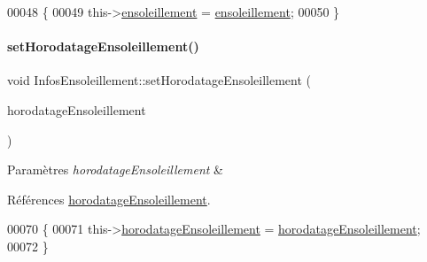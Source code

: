 \begin{DoxyCode}
00048 \{
00049     this->\hyperlink{class_infos_ensoleillement_a5f3ad64743e3beeb4e64c4555ec6155c}{ensoleillement} = \hyperlink{class_infos_ensoleillement_a5f3ad64743e3beeb4e64c4555ec6155c}{ensoleillement};
00050 \}
\end{DoxyCode}
\mbox{\label{class_infos_ensoleillement_a35cd0359b8bcf5bd572cbef2195fa8d1}} 
\paragraph{\texorpdfstring{set\+Horodatage\+Ensoleillement()}{setHorodatageEnsoleillement()}}
{\footnotesize\ttfamily void Infos\+Ensoleillement\+::set\+Horodatage\+Ensoleillement (\begin{DoxyParamCaption}\item[{const Q\+String}]{horodatage\+Ensoleillement }\end{DoxyParamCaption})}


\begin{DoxyParams}{Paramètres}
{\em horodatage\+Ensoleillement} & \\
\hline
\end{DoxyParams}


Références \hyperlink{class_infos_ensoleillement_aa2014f9d13e69e9807543737240dbfd3}{horodatage\+Ensoleillement}.


\begin{DoxyCode}
00070 \{
00071     this->\hyperlink{class_infos_ensoleillement_aa2014f9d13e69e9807543737240dbfd3}{horodatageEnsoleillement} = 
      \hyperlink{class_infos_ensoleillement_aa2014f9d13e69e9807543737240dbfd3}{horodatageEnsoleillement};
00072 \}
\end{DoxyCode}
\mbox{\label{class_infos_ensoleillement_a8c0f6c50648ffc4f47f049727e05e8d0}} 
